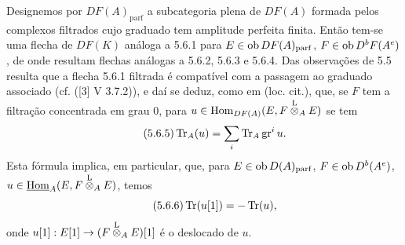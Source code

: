 Designemos por $DF(A)_{\mathrm{parf}}$ a subcategoria plena de $DF(A)$ formada pelos complexos filtrados cujo graduado tem amplitude perfeita finita. Então tem-se uma flecha de $DF(K)$ análoga a 5.6.1 para $E\in\operatorname{ob} DF(A)_{\mathrm{parf}}$, $F\in\operatorname{ob} D^bF(A^e)$, de onde resultam flechas análogas a 5.6.2, 5.6.3 e 5.6.4. Das observações de 5.5 resulta que a flecha 5.6.1 filtrada é compatível com a passagem ao graduado associado (cf. ([3] V 3.7.2)), e daí se deduz, como em (loc. cit.), que, se $F$ tem a filtração concentrada em grau $0$, para $u\in\operatorname{Hom}_{DF(A)}(E,F\overset{\mathrm L}{\otimes}_AE)$ se tem
\begin{equation}\tag{5.6.5}
\operatorname{Tr}_A(u)=\sum_i\operatorname{Tr}_A\operatorname{gr}^i u.
\end{equation}
Esta fórmula implica, em particular, que, para $E\in\operatorname{ob} D(A)_{\mathrm{parf}}$, $F\in\operatorname{ob} D^b(A^e)$, $u\in\underline{\operatorname{Hom}}_A(E,F\overset{\mathrm L}{\otimes}_AE)$, temos
\begin{equation}\tag{5.6.6}
\operatorname{Tr}(u[1])=-\operatorname{Tr}(u),
\end{equation}
onde $u[1]:E[1]\to(F\overset{\mathrm L}{\otimes}_AE)[1]$ é o deslocado de $u$.
